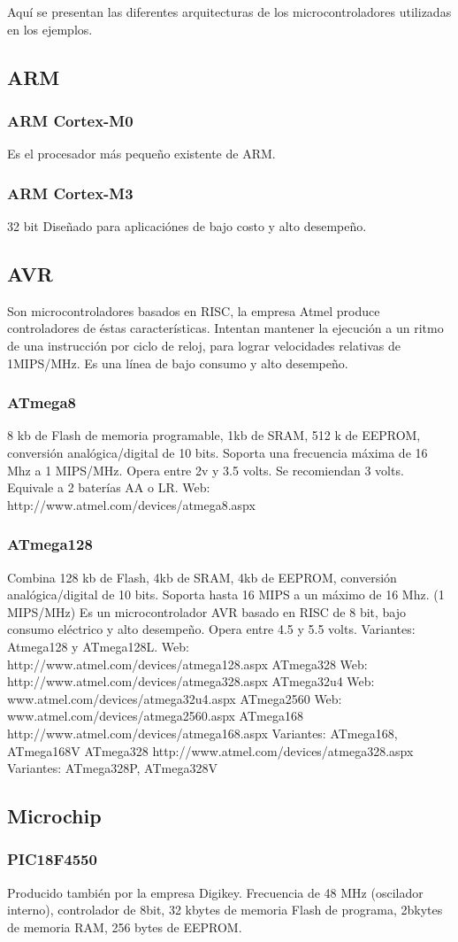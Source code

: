 
Aquí se presentan las diferentes arquitecturas de los
microcontroladores utilizadas en los ejemplos.

\subsection{ARM}
\subsubsection{ARM Cortex-M0}
Es el procesador más pequeño existente de ARM.
\subsubsection{ARM Cortex-M3}
32 bit
Diseñado para aplicaciónes de bajo costo y alto desempeño.

\subsection{AVR}

Son microcontroladores basados en RISC, la empresa Atmel
produce controladores de éstas características.
Intentan mantener la ejecución a un ritmo de una
instrucción por ciclo de reloj, para lograr velocidades
relativas de 1MIPS/MHz.
Es una línea de bajo consumo y alto desempeño.

\subsubsection{ATmega8}
8 kb de Flash de memoria programable, 1kb de SRAM, 512 k de EEPROM, conversión analógica/digital de 10 bits.
Soporta una frecuencia máxima de 16 Mhz a 1 MIPS/MHz.
Opera entre 2v y 3.5 volts. Se recomiendan 3 volts. Equivale a 2 baterías AA o LR.
Web: http://www.atmel.com/devices/atmega8.aspx

\subsubsection{ATmega128}
Combina 128 kb de Flash, 4kb de SRAM, 4kb de EEPROM, conversión analógica/digital de 10 bits. Soporta hasta 16 MIPS a un máximo de 16 Mhz. (1 MIPS/MHz)
Es un microcontrolador AVR basado en RISC de 8 bit, bajo consumo eléctrico y alto desempeño.
Opera entre 4.5 y 5.5 volts.
Variantes: Atmega128 y ATmega128L.
Web: http://www.atmel.com/devices/atmega128.aspx
ATmega328
Web: http://www.atmel.com/devices/atmega328.aspx
ATmega32u4
Web: www.atmel.com/devices/atmega32u4.aspx
ATmega2560
Web: www.atmel.com/devices/atmega2560.aspx
ATmega168
http://www.atmel.com/devices/atmega168.aspx
Variantes: ATmega168, ATmega168V
ATmega328
http://www.atmel.com/devices/atmega328.aspx
Variantes: ATmega328P, ATmega328V

\subsection{Microchip}

\subsubsection{PIC18F4550}

Producido también por la empresa Digikey.
Frecuencia de 48 MHz (oscilador interno), controlador de
8bit, 32 kbytes de memoria Flash de programa,
2bkytes de memoria RAM, 256 bytes de EEPROM. 

